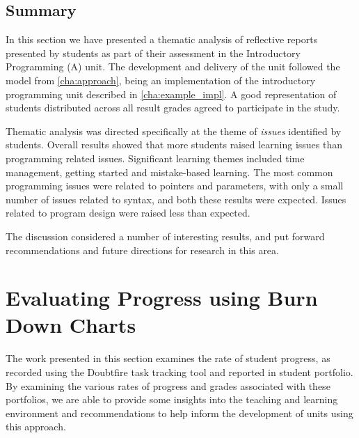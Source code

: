 
\subsection{Summary} %
\label{sub:issues_summary}

In this section we have presented a thematic analysis of reflective reports presented by students as part of their assessment in the Introductory Programming (A) unit. The development and delivery of the unit followed the model from \cref{cha:approach}, being an implementation of the introductory programming unit described in \cref{cha:example_impl}. A good representation of students distributed across all result grades agreed to participate in the study. 

Thematic analysis was directed specifically at the theme of \emph{issues} identified by students. Overall results showed that more students raised learning issues than programming related issues. Significant learning themes included time management, getting started and mistake-based learning. The most common programming issues were related to pointers and parameters, with only a small number of issues related to syntax, and both these results were expected. Issues related to program design were raised less than expected. 

The discussion considered a number of interesting results, and put forward recommendations and future directions for research in this area. 



\clearpage
\section{Evaluating Progress using Burn Down Charts} %
\label{sec:evaluating_progress_using_burndown_charts}

The work presented in this section examines the rate of student progress, as recorded using the Doubtfire task tracking tool and reported in student portfolio. By examining the various rates of progress and grades associated with these portfolios, we are able to provide some insights into the teaching and learning environment and recommendations to help inform the development of units using this approach. 



